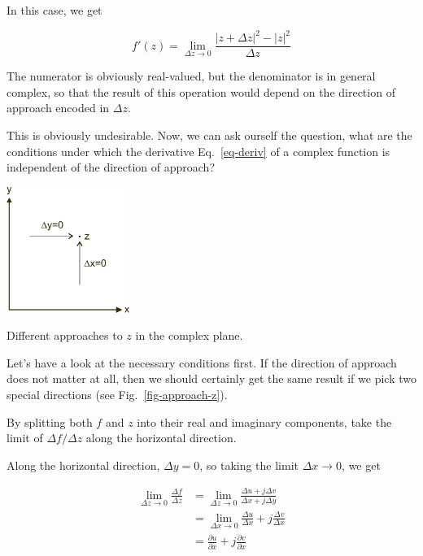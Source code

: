 In this case, we get

$$f'(z)=\lim_{\Delta z \to 0} \frac{|z+\Delta z|^2 - |z|^2}{\Delta z} $$

The numerator is obviously real-valued, but the denominator is in general complex, so that the result of this operation would depend on the direction of approach encoded in $\Delta z$.

This is obviously undesirable. Now, we can ask ourself the question, what are the conditions under which the derivative Eq.~\ref{eq-deriv} of a complex function is independent of the direction of approach?

\pagebreak


\begin{marginfigure}[0cm]
\includegraphics[width=4cm]{complex/figures/approach_z}
\caption{Different approaches to $z$ in the complex plane.}
\label{fig-approach-z}
\end{marginfigure}

Let's have a look at the necessary conditions first. If the direction of approach does not matter at all, then we should certainly get the same result if we pick two special directions (see Fig.~\ref{fig-approach-z}).

\begin{cue}
By splitting both $f$ and $z$ into their real and imaginary components, take the limit of $\Delta f / \Delta z$ along the horizontal direction.
\end{cue}

Along the horizontal direction, $\Delta y = 0$, so taking the limit $\Delta x \to 0$, we get

\begin{align}
\lim_{\Delta z \to 0} \frac{\Delta f}{\Delta z}
& = \lim_{\Delta z \to 0} \frac{\Delta u + j \Delta v}{\Delta x + j \Delta y}
\nonumber \\
& = \lim_{\Delta x \to 0} \frac{\Delta u}{\Delta x} + j \frac{\Delta v}{\Delta
x} \nonumber \\
& = \frac{\partial u}{\partial x} + j \frac{\partial v}{\partial
x}\label{eq-deriv-dx}
\end{align} 

